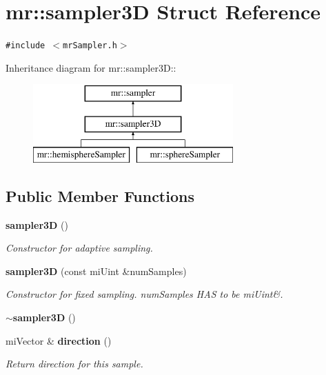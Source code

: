 \section{mr::sampler3D Struct Reference}
\label{structmr_1_1sampler3D}
{\tt \#include $<$mr\-Sampler.h$>$}

Inheritance diagram for mr::sampler3D::\begin{figure}[H]
\begin{center}
\leavevmode
\includegraphics[height=3cm]{structmr_1_1sampler3D}
\end{center}
\end{figure}
\subsection*{Public Member Functions}
\begin{CompactItemize}
\item 
{\bf sampler3D} ()
\begin{CompactList}\small\item\em Constructor for adaptive sampling. \item\end{CompactList}\item 
{\bf sampler3D} (const mi\-Uint \&num\-Samples)
\begin{CompactList}\small\item\em Constructor for fixed sampling. num\-Samples HAS to be mi\-Uint\&. \item\end{CompactList}\item 
{\bf $\sim$sampler3D} ()
\item 
mi\-Vector \& {\bf direction} ()
\begin{CompactList}\small\item\em Return direction for this sample. \item\end{CompactList}\end{CompactItemize}
